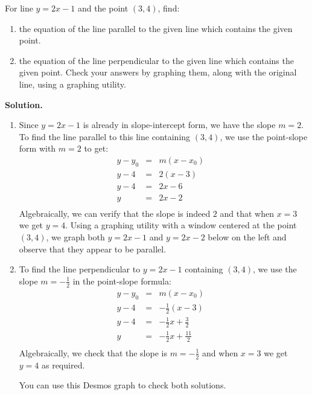 \documentclass{ximera}
\begin{document}
\begin{example}  For line $y = 2x-1$ and the point $(3,4)$, find:

\begin{enumerate}

\item the equation of the line parallel to the given line which contains the given point.

\item   the equation of the line perpendicular to the given line which contains the given point.  Check your answers by graphing them, along with the original line, using a graphing utility.

\end{enumerate}

{\bf Solution.}

\begin{enumerate}

\item Since $y = 2x-1$ is already in slope-intercept form, we have the slope $m = 2$.  To find the line parallel to this line containing $(3,4)$, we use the point-slope form with $m = 2$ to get: \[\begin{array}{rclr} 
y - y_0 & = & m\left(x - x_0\right)  & \\
y - 4 & = & 2 \left(x - 3\right) & \\
y - 4 & = & 2x - 6 & \\
y& = & 2x-2\\
\end{array} \] Algebraically, we can verify that the slope is indeed $2$ and that when $x =3$ we get $y = 4$.  Using a graphing utility with a window centered at the point $(3, 4)$,  we graph both $y = 2x-1$ and $y = 2x-2$ below on the left and observe that they appear to be parallel.

\item To find the line perpendicular to $y = 2x-1$ containing $(3,4)$, we use the slope $m = -\frac{1}{2}$ in the point-slope formula:\[\begin{array}{rclr} 
y - y_0 & = & m\left(x - x_0\right)  & \\ 
y - 4 & = & -\frac{1}{2} \left(x - 3\right) & \\  
y - 4 & = & -\frac{1}{2} x + \frac{3}{2} & \\  
y& = & -\frac{1}{2} x + \frac{11}{2}\\
\end{array} \]  Algebraically, we check that the slope is $m = -\frac{1}{2}$ and when $x = 3$ we get $y = 4$ as required.  

You can use this Desmos graph to check both solutions.

\begin{center}
\end{center}

\end{enumerate}


\end{example}
\end{document}

